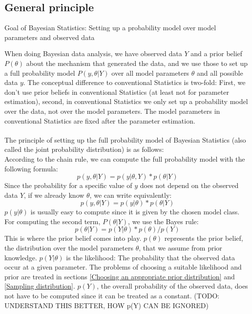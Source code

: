 \documentclass{article}
\begin{document}
\subsection{General principle}
Goal of Bayesian Statistics: Setting up a probability model over model parameters and observed data

When doing Bayesian data analysis, we have observed data $Y$ and a prior belief $P(\theta)$ about the mechanism that generated the data, and we use those to set up a full probability model $P(y,\theta|Y)$ over all model parameters $\theta$ and all possible data $y$. The conceptual difference to conventional Statistics is two-fold: First, we don't use prior beliefs in conventional Statistics (at least not for parameter estimation), second, in conventional Statistics we only set up a probability model over the data, not over the model parameters. The model parameters in conventional Statistics are fixed after the parameter estimation.
\\
\\
The principle of setting up the full probability model of Bayesian Statistics (also called the joint probability distribution) is as follows:
\\
According to the chain rule, we can compute the full probability model with the following formula:
\begin{equation}
p(y,\theta|Y) = p(y|\theta,Y) * p(\theta|Y)
\end{equation}
Since the probability for a specific value of $y$ does not depend on the observed data $Y$, if we already know $\theta$, we can write equivalently:
\begin{equation}
p(y,\theta|Y) = p(y|\theta) * p(\theta|Y)
\end{equation}
$p(y|\theta)$ is usually easy to compute since it is given by the chosen model class. For computing the second term, $P(\theta|Y)$, we use the Bayes rule:
\begin{equation}
p(\theta|Y) = p(Y|\theta) * p(\theta) / p(Y)
\end{equation}
This is where the prior belief comes into play.  $p(\theta)$ represents the prior belief, the distribution over the model parameters $\theta$, that we assume from prior knowledge. $p(Y|\theta)$ is the likelihood: The probability that the observed data occur at a given parameter. The problems of choosing a suitable likelihood and prior are treated in sections \ref{Choosing an appropriate prior distribution} and \ref{Sampling distribution}. $p(Y)$, the overall probability of the observed data, does not have to be computed since it can be treated as a constant. (TODO: UNDERSTAND THIS BETTER, HOW p(Y) CAN BE IGNORED)
\end{document}
